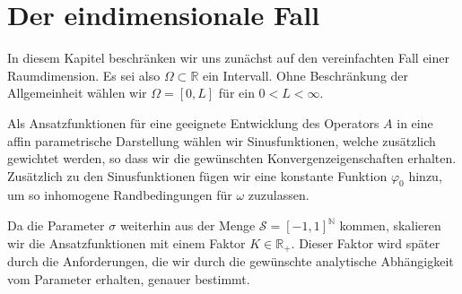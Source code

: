 
\iftoggle{dictum}{
    \setchapterpreamble[ul][0.6\textwidth]{%
        \dictum[Robert Heinlein, \textit{Time Enough For Love}]{\enquote{Progress isn't made by early risers. It's made by lazy men trying to find easier ways to do something.}}
        \vspace*{2\baselineskip}
    }
}{}
\chapter{Der eindimensionale Fall}
\label{sec:der_eindimensionale_fall}
\label{cha:der_eindimensionale_fall}


In diesem Kapitel beschränken wir uns zunächst auf den vereinfachten Fall einer Raumdimension.
Es sei also $\Omega \subset \mathbb{R}$ ein Intervall.
Ohne Beschränkung der Allgemeinheit wählen wir $\Omega = [0, L]$ für ein $0 < L < \infty$.



Als Ansatzfunktionen für eine geeignete Entwicklung des Operators $A$ in eine affin parametrische Darstellung wählen wir Sinusfunktionen, welche zusätzlich gewichtet werden, so dass wir die gewünschten Konvergenzeigenschaften erhalten.
Zusätzlich zu den Sinusfunktionen fügen wir eine konstante Funktion $\varphi_{0}$ hinzu, um so inhomogene Randbedingungen für $\omega$ zuzulassen.

Da die Parameter $\sigma$ weiterhin aus der Menge $\mathcal S = [-1, 1]^{\mathbb{N}}$ kommen, skalieren wir die Ansatzfunktionen mit einem Faktor $K \in \mathbb{R}_{+}$.
Dieser Faktor wird später durch die Anforderungen, die wir durch die gewünschte analytische Abhängigkeit vom Parameter erhalten, genauer bestimmt.

